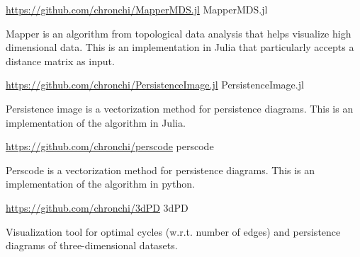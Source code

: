 \begin{cventries}
\cventry
  {\url{https://github.com/chronchi/MapperMDS.jl}} %
  {MapperMDS.jl} %
  {}{}
  {
    \begin{cvitems} %
      \item {Mapper is an algorithm from topological data analysis that
      helps visualize high dimensional data. This is
      an implementation in Julia that particularly accepts a distance matrix
      as input.}
    \end{cvitems}
  }

\cventry
  {\url{https://github.com/chronchi/PersistenceImage.jl}} %
  {PersistenceImage.jl} %
  {}{}
  {
    \begin{cvitems} %
      \item {Persistence image is a vectorization method for persistence
      diagrams. This is an implementation of the algorithm in Julia.}
    \end{cvitems}
  }

\cventry
  {\url{https://github.com/chronchi/perscode}} %
  {perscode} %
  {}{}
  {
    \begin{cvitems} %
      \item {Perscode is a vectorization method for persistence
      diagrams. This is an implementation of the algorithm in python.}
    \end{cvitems}
  }

\cventry
  {\url{https://github.com/chronchi/3dPD}} %
  {3dPD} %
  {}{}
  {
    \begin{cvitems} %
        \item {Visualization tool for optimal cycles (w.r.t. number of edges) and persistence
	       diagrams of three-dimensional datasets.}
    \end{cvitems}
  }

\end{cventries}
